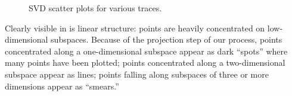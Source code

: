 \documentclass[conference]{IEEEtran}
\begin{document}
\begin{figure}[!t]
\vspace{0.5em}
\begin{center}
\caption{SVD scatter plots for various traces.} 
\end{center}
\vspace{-0.85em}
\end{figure}

Clearly visible in  is linear structure:
points are heavily concentrated on low-dimensional subspaces.
Because of the projection step of our process, points concentrated along a one-dimensional subspace appear as dark ``spots'' where many points have been plotted;
points concentrated along a two-dimensional subspace appear as lines;
points falling along subspaces of three or more dimensions appear as ``smears.''
\end{document}
